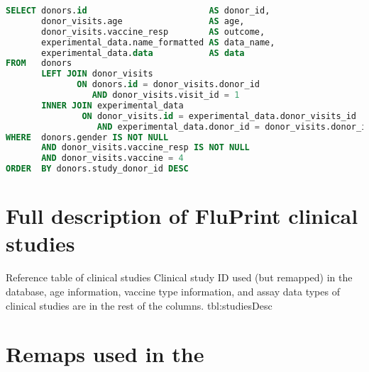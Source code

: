 \begin{appendices}
\begin{minipage}{\linewidth}
\begin{lstlisting}[language=sql, caption=Query of initial SIMON data, label={lst:QueryTemplate}]
SELECT donors.id                        AS donor_id,
       donor_visits.age                 AS age,
       donor_visits.vaccine_resp        AS outcome,
       experimental_data.name_formatted AS data_name,
       experimental_data.data           AS data
FROM   donors
       LEFT JOIN donor_visits
              ON donors.id = donor_visits.donor_id
                 AND donor_visits.visit_id = 1
       INNER JOIN experimental_data
               ON donor_visits.id = experimental_data.donor_visits_id
                  AND experimental_data.donor_id = donor_visits.donor_id
WHERE  donors.gender IS NOT NULL
       AND donor_visits.vaccine_resp IS NOT NULL
       AND donor_visits.vaccine = 4
ORDER  BY donors.study_donor_id DESC
\end{lstlisting}
\end{minipage}

    \section{Full description of FluPrint clinical studies}

{Reference table of clinical studies}
{Clinical study ID used (but remapped) in the database, age information,
vaccine type information, and assay data types of clinical studies are in the
rest of the columns.}
{tbl:studiesDesc}


    \section{Remaps used in the \flup}


\end{appendices}
